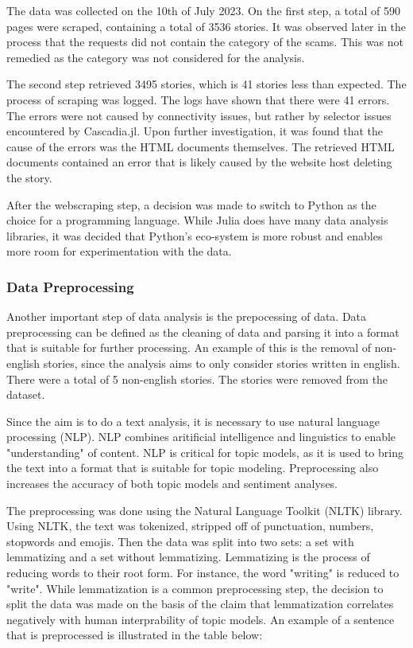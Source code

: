 \documentclass[12pt,english,titlepage,a4paper]{article}
\begin{document}
The data was collected on the 10th of July 2023. On the first step, a total of 590 pages were scraped, containing a total of 3536 stories. It was observed later in the process that the requests did not contain the category of the scams. This was not remedied as the category was not considered for the analysis.

The second step retrieved 3495 stories, which is 41 stories less than expected. The process of scraping was logged. The logs have shown that there were 41 errors. The errors were not caused by connectivity issues, but rather by selector issues encountered by Cascadia.jl. Upon further investigation, it was found that the cause of the errors was the HTML documents themselves. The retrieved HTML documents contained an error that is likely caused by the website host deleting the story.

After the webscraping step, a decision was made to switch to Python as the choice for a programming language. While Julia does have many data analysis libraries, it was decided that Python's eco-system is more robust and enables more room for experimentation with the data. 

\subsubsection{Data Preprocessing}

Another important step of data analysis is the prepocessing of data. Data preprocessing can be defined as the cleaning of data and parsing it into a format that is suitable for further processing. An example of this is the removal of non-english stories, since the analysis aims to only consider stories written in english. There were a total of 5 non-english stories. The stories were removed from the dataset.

Since the aim is to do a text analysis, it is necessary to use natural language processing (NLP). NLP combines aritificial intelligence and linguistics to enable "understanding" of content. NLP is critical for topic models, as it is used to bring the text into a format that is suitable for topic modeling. Preprocessing also increases the accuracy of both topic models and sentiment analyses.~\cite{haddi2013role}\cite{chauhan2021topic}

The preprocessing was done using the Natural Language Toolkit (NLTK) library. Using NLTK, the text was tokenized, stripped off of punctuation, numbers, stopwords and emojis. Then the data was split into two sets: a set with lemmatizing and a set without lemmatizing. Lemmatizing is the process of reducing words to their root form. For instance, the word "writing" is reduced to "write". While lemmatization is a common preprocessing step, the decision to split the data was made on the basis of the claim that lemmatization correlates negatively with human interprability of topic models. An example of a sentence that is preprocessed is illustrated in the table below:
\end{document}
